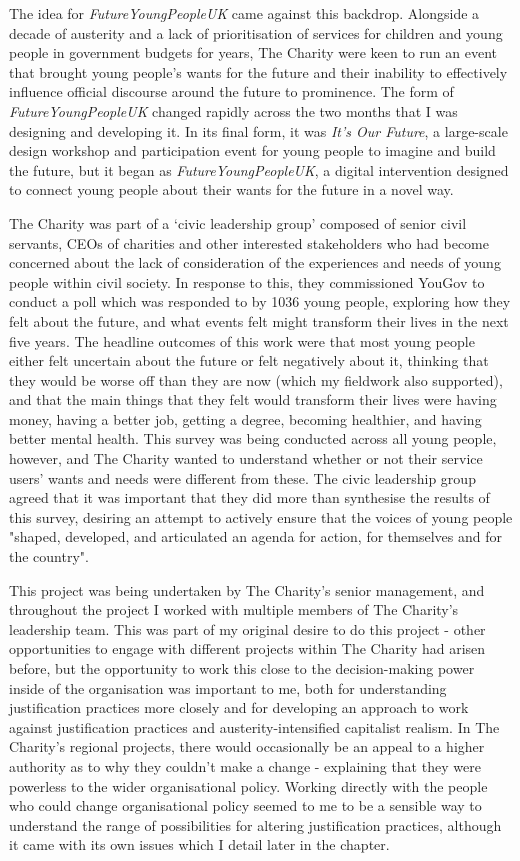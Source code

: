 The idea for \textit{FutureYoungPeopleUK} came against this backdrop. Alongside a decade of austerity and a lack of prioritisation of services for children and young people in government budgets for years, The Charity were keen to run an event that brought young people’s wants for the future and their inability to effectively influence official discourse around the future to prominence. The form of \emph{FutureYoungPeopleUK} changed rapidly across the two months that I was designing and developing it. In its final form, it was \emph{It’s Our Future}, a large-scale design workshop and participation event for young people to imagine and build the future, but it began as \emph{FutureYoungPeopleUK}, a digital intervention designed to connect young people about their wants for the future in a novel way. 

The Charity was part of a ‘civic leadership group’ composed of senior civil servants, CEOs of charities and other interested stakeholders who had become concerned about the lack of consideration of the experiences and needs of young people within civil society. In response to this, they commissioned YouGov to conduct a poll which was responded to by 1036 young people, exploring how they felt about the future, and what events felt might transform their lives in the next five years. The headline outcomes of this work were that most young people either felt uncertain about the future or felt negatively about it, thinking that they would be worse off than they are now (which my fieldwork also supported), and that the main things that they felt would transform their lives were having money, having a better job, getting a degree, becoming healthier, and having better mental health. This survey was being conducted across all young people,  however, and The Charity wanted to understand whether or not their service users' wants and needs were different from these. The civic leadership group agreed that it was important that they did more than synthesise the results of this survey, desiring an attempt to actively ensure that the voices of young people "shaped, developed, and articulated an agenda for action, for themselves and for the country". 

This project was being undertaken by The Charity's senior management, and throughout the project I worked with multiple members of The Charity's leadership team. This was part of my original desire to do this project - other opportunities to engage with different projects within The Charity had arisen before, but the opportunity to work this close to the decision-making power inside of the organisation was important to me, both for understanding justification practices more closely and for developing an approach to work against justification practices and austerity-intensified capitalist realism. In The Charity's regional projects, there would occasionally be an appeal to a higher authority as to why they couldn't make a change - explaining that they were powerless to the wider organisational policy. Working directly with the people who could change organisational policy seemed to me to be a sensible way to understand the range of possibilities for altering justification practices, although it came with its own issues which I detail later in the chapter.

